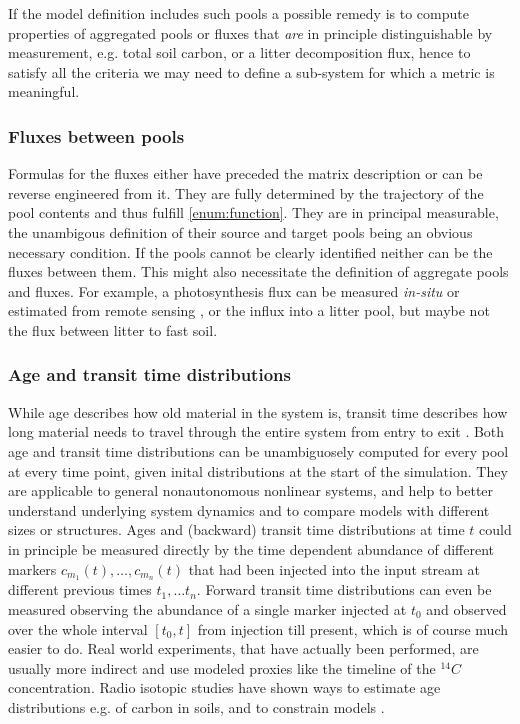If the model definition includes such pools a possible remedy is to compute properties of 
aggregated pools or fluxes that \emph{are} in principle distinguishable by measurement, e.g. total soil carbon,
or a litter decomposition flux, hence to satisfy all the criteria we may need
to define a sub-system for which a metric is meaningful.   

\subsubsection{Fluxes between pools}
Formulas for the fluxes  either have preceded the matrix description or can be reverse engineered from it. They are fully determined by the trajectory of the pool contents and thus fulfill \ref{enum:function}.
They are in principal measurable, the unambigous definition of their source and target pools being an obvious necessary condition. If the pools cannot be clearly identified neither can be the fluxes between them. 
This might also necessitate the definition of aggregate pools and fluxes.
For example, a photosynthesis flux can be measured \textit{in-situ} or estimated from remote sensing \cite{jez_emerging_2021, sun_remotely_2023}, or the influx into a litter pool, but maybe not the flux between litter to fast soil.

\subsubsection{Age and transit time distributions}
While age describes how old material in the system is, transit time describes how
long material needs to travel through the entire system from entry to exit
\cite{bolin1973Tellus, Sierra2017GCB}.
Both age and transit time distributions can be unambiguosely computed for every pool at every time point, given inital distributions at the start of the simulation.
They are applicable to general nonautonomous nonlinear systems, and help to better understand underlying system dynamics and to compare models
with different sizes or structures.  Ages and (backward) transit time
distributions at time $t$ could in principle be measured directly by the time
dependent abundance of different markers $c_{m_1}(t),\dots, c_{m_n}(t)$ that
had been injected into the input stream at different previous times $t_1,\dots
t_n$. Forward transit time distributions can even be measured observing the
abundance of a single marker injected at $t_0$ and observed over the whole interval $[t_0,t]$ from injection till present, which is of course much easier to do.
Real world experiments, that have actually been performed, are usually more indirect and use modeled proxies like the timeline of the $^{14}C$ concentration.
Radio isotopic studies have shown ways to estimate 
age distributions e.g. of carbon in soils, and to constrain models
\cite{Trumbore2016, shi_age_2020}.

